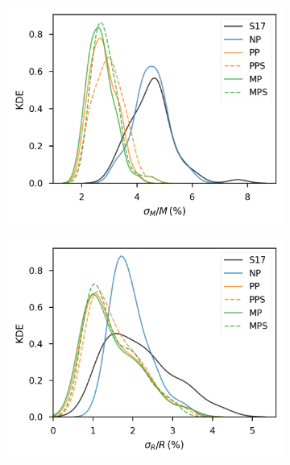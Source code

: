 \documentclass[fleqn,usenatbib]{mnras}
\begin{document}
\begin{figure}
    \centering
    \begin{subfigure}[b]{.33\linewidth}
        \centering
        \includegraphics[width=\linewidth]{figures/sigma_mass.png}
    \end{subfigure}%
    \begin{subfigure}[b]{.33\linewidth}
        \centering
        \includegraphics[width=\linewidth]{figures/sigma_rad.png}
    \end{subfigure}%
    \begin{subfigure}[b]{.33\linewidth}
        \centering

\end{subfigure}
\end{figure}
\end{document}
